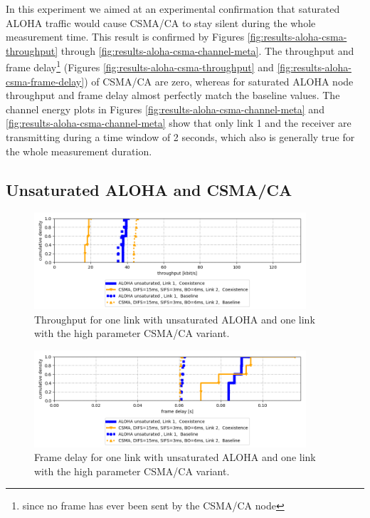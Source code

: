 In this experiment we aimed at an experimental confirmation that saturated ALOHA traffic would cause CSMA/CA to stay silent during the whole measurement time. This result is confirmed by Figures \ref{fig:results-aloha-csma-throughput} through \ref{fig:results-aloha-csma-channel-meta}. The throughput and frame delay\footnote{since no frame has ever been sent by the CSMA/CA node} (Figures \ref{fig:results-aloha-csma-throughput} and \ref{fig:results-aloha-csma-frame-delay}) of CSMA/CA are zero, whereas for saturated ALOHA node throughput and frame delay almost perfectly match the baseline values. The channel energy plots in Figures \ref{fig:results-aloha-csma-channel-meta} and \ref{fig:results-aloha-csma-channel-meta} show that only link 1 and the receiver are transmitting during a time window of 2 seconds, which also is generally true for the whole measurement duration. 

\subsection{Unsaturated ALOHA and CSMA/CA}
\label{sec:unsat-aloha-csma}

\begin{figure}[tb]
	\label{fig:results-unsat-aloha-csma-throughput}
	\begin{center}
		\includegraphics[width=0.9\textwidth]{pictures/results/different_combinations/aloha_unsat_csma/throughput_cdf}
	\end{center}
	\caption{Throughput for one link with unsaturated ALOHA and one link with the high parameter CSMA/CA variant.}
\end{figure}

\begin{figure}[tb]
	\label{fig:results-unsat-aloha-csma-frame-delay}
	\begin{center}
		\includegraphics[width=0.9\textwidth]{pictures/results/different_combinations/aloha_unsat_csma/frame_delay_cdf}
	\end{center}
	\caption{Frame delay for one link with unsaturated ALOHA and one link with the high parameter CSMA/CA variant.}
\end{figure}

